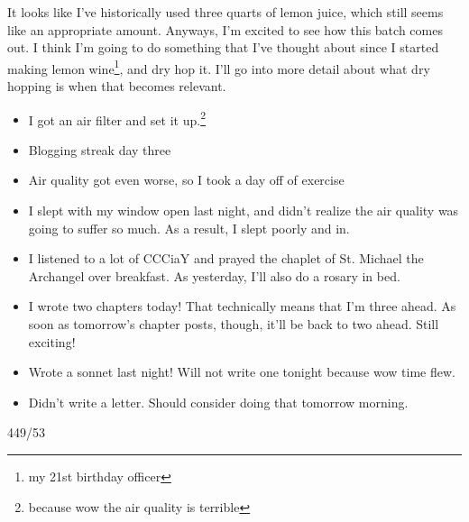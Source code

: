 \documentclass[12pt]{article}[titlepage]
\newcommand{\1}{\={a}}
\newcommand{\2}{\={e}}
\newcommand{\3}{\={\i}}
\newcommand{\4}{\=o}
\newcommand{\5}{\=u}
\newcommand{\6}{\={A}}
\renewcommand{\,}{\textsuperscript{,}}
\begin{document}
It looks like I've historically used three quarts of lemon juice, which still seems like an appropriate amount.
Anyways, I'm excited to see how this batch comes out.
I think I'm going to do something that I've thought about since I started making lemon wine\footnote{my 21st birthday officer}, and dry hop it.
I'll go into more detail about what dry hopping is when that becomes relevant.


\begin{itemize}
\item I got an air filter and set it up.\footnote{because wow the air quality is terrible}
\item Blogging streak day three
\item Air quality got even worse, so I took a day off of exercise
\item I slept with my window open last night, and didn't realize the air quality was going to suffer so much. As a result, I slept poorly and in.
\item I listened to a lot of CCCiaY and prayed the chaplet of St. Michael the Archangel over breakfast. As yesterday, I'll also do a rosary in bed.
\item I wrote two chapters today! That technically means that I'm three ahead. As soon as tomorrow's chapter posts, though, it'll be back to two ahead. Still exciting!
\item Wrote a sonnet last night! Will not write one tonight because wow time flew.
\item Didn't write a letter. Should consider doing that tomorrow morning.
\end{itemize}

449/53
\end{document}
